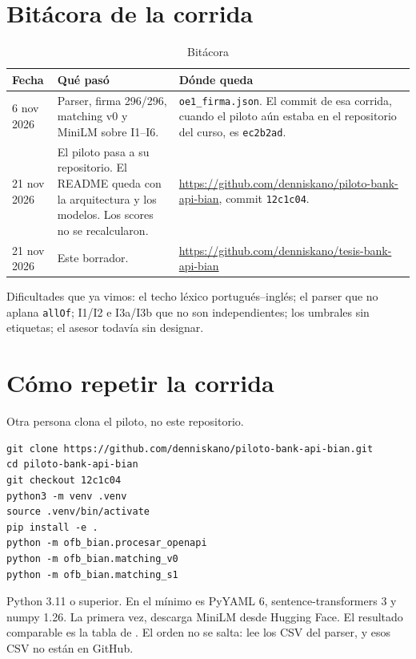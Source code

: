 \appendix
\renewcommand{\thesection}{\thechapter.\arabic{section}}
\chapter{Bitácora de la corrida}
\label{anexo:bitacora}

\begin{table}[ht]
  \centering
  \caption{Bitácora}
  \label{tab:bitacora}
  \small
  \begin{tabular}{@{}p{}p{}p{}@{}}
    \toprule
    Fecha & Qué pasó & Dónde queda \\
    \midrule
    6 nov 2026 & Parser, firma 296/296, matching v0 y MiniLM sobre I1--I6. & \texttt{oe1\_firma.json}. El commit de esa corrida, cuando el piloto aún estaba en el repositorio del curso, es \texttt{ec2b2ad}. \\
    21 nov 2026 & El piloto pasa a su repositorio. El README queda con la arquitectura y los modelos. Los scores no se recalcularon. & \url{https://github.com/denniskano/piloto-bank-api-bian}, commit \texttt{12c1c04}. \\
    21 nov 2026 & Este borrador. & \url{https://github.com/denniskano/tesis-bank-api-bian} \\
    \bottomrule
  \end{tabular}
\end{table}

Dificultades que ya vimos: el techo léxico portugués--inglés; el parser que no aplana \texttt{allOf}; I1/I2 e I3a/I3b que no son independientes; los umbrales sin etiquetas; el asesor todavía sin designar.

\chapter{Cómo repetir la corrida}
\label{anexo:repro}

Otra persona clona el piloto, no este repositorio.

\begin{lstlisting}
git clone https://github.com/denniskano/piloto-bank-api-bian.git
cd piloto-bank-api-bian
git checkout 12c1c04
python3 -m venv .venv
source .venv/bin/activate
pip install -e .
python -m ofb_bian.procesar_openapi
python -m ofb_bian.matching_v0
python -m ofb_bian.matching_s1
\end{lstlisting}

Python 3.11 o superior. En  el mínimo es PyYAML 6, sentence-transformers 3 y numpy 1.26. La primera vez,  descarga MiniLM desde Hugging Face. El resultado comparable es la tabla de . El orden no se salta:  lee los CSV del parser, y esos CSV no están en GitHub.


